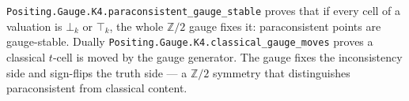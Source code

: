 \begin{theorem}\label{thm:gauge-stable}\leanok{}
\texttt{Positing.Gauge.K4.paraconsistent\_gauge\_stable} proves that if every cell of a valuation is $\bot_k$ or $\top_k$, the whole $\mathbb{Z}/2$ gauge fixes it: paraconsistent points are gauge-stable. Dually \texttt{Positing.Gauge.K4.classical\_gauge\_moves} proves a classical $t$-cell is moved by the gauge generator. The gauge fixes the inconsistency side and sign-flips the truth side --- a $\mathbb{Z}/2$ symmetry that distinguishes paraconsistent from classical content.
\end{theorem}
